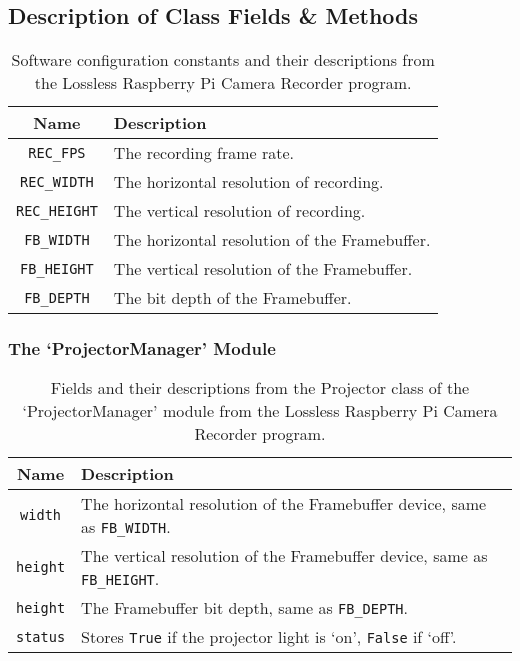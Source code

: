 \subsection{Description of Class Fields \& Methods}
\label{rec_tbls}
\begin{table}[H]
    \centering
    \begin{tabularx}{\linewidth}{c | X}
        Name    &   Description\\
        \hline
        \hline
        \texttt{REC\_FPS}          &   The recording frame rate.\\
        \hline
        \texttt{REC\_WIDTH}         & The horizontal resolution of recording.\\
        \hline
        \texttt{REC\_HEIGHT}         & The vertical resolution of recording.\\
        \hline
        \texttt{FB\_WIDTH}         &  The horizontal resolution of the Framebuffer.\\
        \hline
        \texttt{FB\_HEIGHT}         & The vertical resolution of the Framebuffer.\\
        \hline
        \texttt{FB\_DEPTH}          & The bit depth of the Framebuffer.\\
        \hline
    \end{tabularx}
    \caption{Software configuration constants and their descriptions from the Lossless Raspberry Pi Camera Recorder program.}
    \label{table:recparams}
\end{table}

\subsubsection{The `ProjectorManager' Module}

\begin{table}[H]
    \centering
    \begin{tabularx}{\linewidth}{c | X}
        Name    &   Description\\
        \hline
        \hline
        \texttt{width} & The horizontal resolution of the Framebuffer device, same as \texttt{FB\_WIDTH}.\\
        \hline
        \texttt{height} & The vertical resolution of the Framebuffer device, same as \texttt{FB\_HEIGHT}.\\
        \hline
        \texttt{height} & The Framebuffer bit depth, same as \texttt{FB\_DEPTH}.\\
        \hline
        \texttt{status} & Stores \texttt{True} if the projector light is `on', \texttt{False} if `off'.\\
        \hline
    \end{tabularx}
    \caption{Fields and their descriptions from the Projector class of the `ProjectorManager' module from the Lossless Raspberry Pi Camera Recorder program.}
    \label{table:projectormanagerclassfields}
\end{table}

